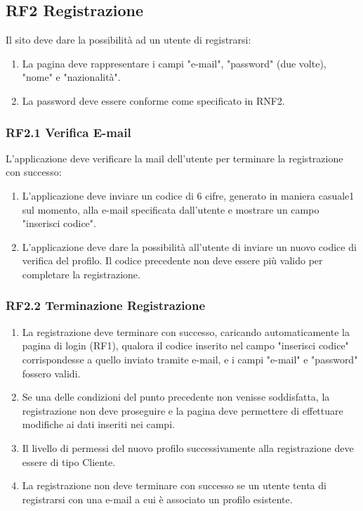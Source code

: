 \documentclass{report}
\begin{document}
\subsection*{RF2 Registrazione}
Il sito deve dare la possibilità ad un utente di registrarsi:
\begin{enumerate}
	\item La pagina deve rappresentare i campi "e-mail", "password" (due volte), "nome" e "nazionalità". 
	\item La password deve essere conforme come specificato in RNF2.
\end{enumerate}

\subsubsection*{RF2.1 Verifica E-mail}
L'applicazione deve verificare la mail dell'utente per terminare la registrazione con successo:

\begin{enumerate}
	\item L'applicazione deve inviare un codice di 6 cifre, generato in maniera casuale1 sul momento, alla e-mail specificata dall’utente e mostrare un campo "inserisci codice".
		
	\item L'applicazione deve dare la possibilità all’utente di inviare un nuovo codice di verifica del profilo. Il codice precedente non deve essere più valido per completare la registrazione.
		
\end{enumerate}


\subsubsection*{RF2.2 Terminazione Registrazione}
\begin{enumerate}
	\item La registrazione deve terminare con successo, caricando automaticamente la pagina di login (RF1), qualora il codice inserito nel campo "inserisci codice" corrispondesse a quello inviato tramite e-mail, e i campi "e-mail" e "password" fossero validi.
	\item Se una delle condizioni del punto precedente non venisse soddisfatta, la registrazione non deve proseguire e la pagina deve permettere di effettuare modifiche ai dati inseriti nei campi.
	\item Il livello di permessi del nuovo profilo successivamente alla registrazione deve essere di tipo Cliente.
	\item La registrazione non deve terminare con successo se un utente tenta di registrarsi con una e-mail a cui è associato un profilo esistente.

\end{enumerate}
\end{document}
